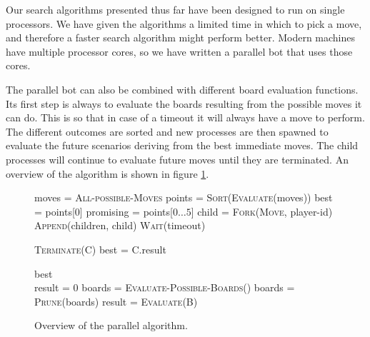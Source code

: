 
Our search algorithms presented thus far have been designed to run on
single processors. We have given the algorithms a limited time in
which to pick a move, and therefore a faster search algorithm might
perform better. Modern machines have multiple processor cores, so we
have written a parallel bot that uses those cores.



The parallel bot can also be combined with different board evaluation functions.
Its first step is always to
evaluate the boards resulting from the possible moves it can do. This is so that in case of a
timeout it will always have a move to perform.
The different outcomes are sorted and new processes are then spawned to
evaluate the future scenarios deriving from the best immediate moves.
The child processes will continue to evaluate future moves until they are
terminated.
An overview of the algorithm is shown in figure \ref{parallel_algorithm}.

\begin{figure}
\begin{algorithmic}
    \State moves = \textsc{All-possible-Moves}
    \State points = \textsc{Sort}(\textsc{Evaluate}(moves))
    \State best = points[0]
    \State promising = points[$0\dots 5$]
        \State child = \textsc{Fork}(\textsc{Move}, player-id)
        \State \textsc{Append}(children, child)
    \EndFor
    \State \textsc{Wait}(timeout)

        \State \textsc{Terminate}(C)
            \State best = C.result
        \EndIf
    \EndFor

    \State \Return best
\EndFunction
\\
    \State result = 0
    \While{$\top$}
            \State boards = \textsc{Evaluate-Possible-Boards}()
            \State boards = \textsc{Prune}(boards)
                    \State result = \textsc{Evaluate}(B)
                \EndIf
            \EndFor
        \EndFor
    \EndWhile
\EndFunction

\end{algorithmic}
\caption{Overview of the parallel algorithm.}
\label{parallel_algorithm}
\end{figure}
